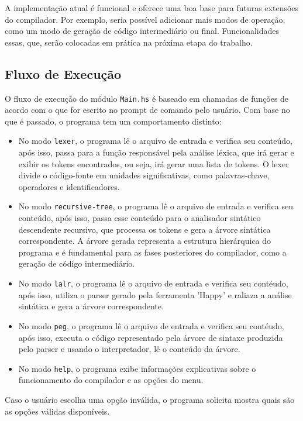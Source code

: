 \documentclass{article}
\begin{document}
A implementação atual é funcional e oferece uma boa base para futuras extensões do compilador. Por exemplo, seria possível adicionar mais modos de operação, como um modo de geração de código intermediário ou final. Funcionalidades essas, que, serão colocadas em prática na próxima etapa do trabalho.

\subsection{Fluxo de Execução}

O fluxo de execução do módulo \texttt{Main.hs} é baseado em chamadas de funções de acordo com o que for escrito no prompt de comando pelo usuário. Com base no que é passado, o programa tem um comportamento distinto:

\begin{itemize}
    \item No modo \texttt{lexer}, o programa lê o arquivo de entrada e verifica seu conteúdo, após isso, passa para a função responsável pela análise léxica, que irá gerar e exibir os tokens encontrados, ou seja, irá gerar uma lista de tokens. O lexer divide o código-fonte em unidades significativas, como palavras-chave, operadores e identificadores.
    \item No modo \texttt{recursive-tree}, o programa lê o arquivo de entrada e verifica seu conteúdo, após isso, passa esse conteúdo para o analisador sintático descendente recursivo, que processa os tokens e gera a árvore sintática correspondente. A árvore gerada representa a estrutura hierárquica do programa e é fundamental para as fases posteriores do compilador, como a geração de código intermediário.
    \item No modo \texttt{lalr}, o programa lê o arquivo de entrada e verifica seu contéudo, após isso, utiliza o parser gerado pela ferramenta 'Happy' e raliaza a análise sintática e gera a árvore correspondente.
    \item No modo \texttt{peg}, o programa lê o arquivo de entrada e verifica seu contéudo, após isso, executa o código representado pela árvore de sintaxe produzida pelo parser e usando o interpretador, lê o conteúdo da árvore.
    \item No modo \texttt{help}, o programa exibe informações explicativas sobre o funcionamento do compilador e as opções do menu.
\end{itemize}

Caso o usuário escolha uma opção inválida, o programa solicita mostra quais são as opções válidas disponíveis.
\end{document}
